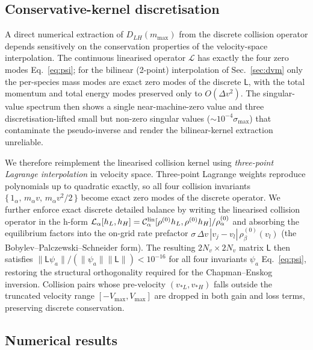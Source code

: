 \documentclass[aps,pre,twocolumn,superscriptaddress,longbibliography,floatfix]{revtex4-2}
\begin{document}
\subsection{Conservative-kernel discretisation}

A direct numerical extraction of $D_{LH}(m_{\max})$ from the
discrete collision operator depends sensitively on the
conservation properties of the velocity-space interpolation.
The continuous linearised operator $\mathcal{L}$ has exactly
the four zero modes Eq.~\eqref{eq:psi}; for the bilinear
(2-point) interpolation of Sec.~\ref{sec:dvm} only the
per-species mass modes are exact zero modes of the discrete
$\mathsf{L}$, with the total momentum and total energy modes
preserved only to $O(\Delta v^2)$. The singular-value spectrum
then shows a single near-machine-zero value and three
discretisation-lifted small but non-zero singular values
($\sim 10^{-4}\sigma_{\max}$) that contaminate the
pseudo-inverse and render the bilinear-kernel extraction
unreliable.

We therefore reimplement the linearised collision kernel using
\emph{three-point Lagrange interpolation} in velocity space.
Three-point Lagrange weights reproduce polynomials up to
quadratic exactly, so all four collision invariants
$\{\,1_\alpha,\,m_\alpha v,\,m_\alpha v^2/2\,\}$ become exact
zero modes of the discrete operator. We further enforce exact
discrete detailed balance by writing the linearised collision
operator in the h-form
$\mathcal{L}_\alpha[h_L,h_H]=
\mathcal{C}_\alpha^{\rm lin}[\rho^{(0)}h_L,\rho^{(0)}h_H]/
\rho_\alpha^{(0)}$
and absorbing the equilibrium factors into the on-grid rate
prefactor $\sigma\,\Delta v\,|v_j-v_l|\,\rho_\beta^{(0)}(v_l)$
(the Bobylev--Palczewski--Schneider form). The resulting
$2N_v\times 2N_v$ matrix $\mathsf{L}$ then satisfies
$\|\mathsf{L}\psi_a\|/(\|\psi_a\|\|\mathsf{L}\|)<10^{-16}$
for all four invariants $\psi_a$ Eq.~\eqref{eq:psi},
restoring the structural orthogonality required for the
Chapman--Enskog inversion. Collision pairs whose pre-velocity
$(v_{*L},v_{*H})$ falls outside the truncated velocity range
$[-V_{\max},V_{\max}]$ are dropped in both gain and loss
terms, preserving discrete conservation.

\subsection{Numerical results}
\end{document}
